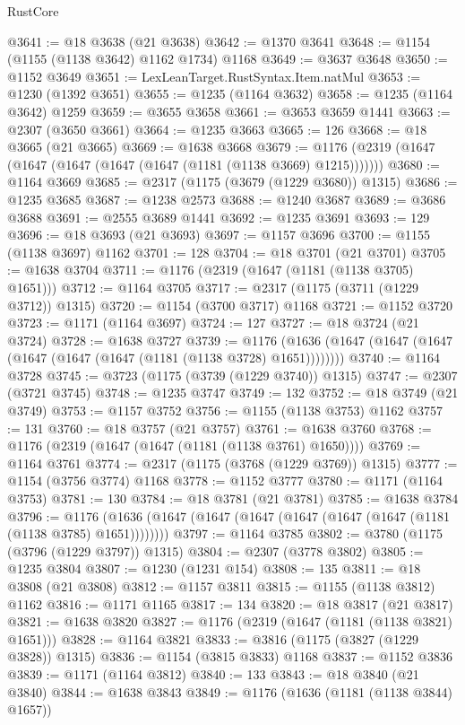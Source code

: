 \begin{lexlean}{RustCore}
\begin{coremodule}
@3641 := @18 @3638 (@21 @3638)
@3642 := @1370 @3641
@3648 := @1154 (@1155 (@1138 @3642) @1162 @1734) @1168
@3649 := @3637 @3648
@3650 := @1152 @3649
@3651 := LexLeanTarget.RustSyntax.Item.natMul
@3653 := @1230 (@1392 @3651)
@3655 := @1235 (@1164 @3632)
@3658 := @1235 (@1164 @3642) @1259
@3659 := @3655 @3658
@3661 := @3653 @3659 @1441
@3663 := @2307 (@3650 @3661)
@3664 := @1235 @3663
@3665 := 126
@3668 := @18 @3665 (@21 @3665)
@3669 := @1638 @3668
@3679 := @1176 (@2319 (@1647 (@1647 (@1647 (@1647 (@1647 (@1181 (@1138 @3669) @1215)))))))
@3680 := @1164 @3669
@3685 := @2317 (@1175 (@3679 (@1229 @3680)) @1315)
@3686 := @1235 @3685
@3687 := @1238 @2573
@3688 := @1240 @3687
@3689 := @3686 @3688
@3691 := @2555 @3689 @1441
@3692 := @1235 @3691
@3693 := 129
@3696 := @18 @3693 (@21 @3693)
@3697 := @1157 @3696
@3700 := @1155 (@1138 @3697) @1162
@3701 := 128
@3704 := @18 @3701 (@21 @3701)
@3705 := @1638 @3704
@3711 := @1176 (@2319 (@1647 (@1181 (@1138 @3705) @1651)))
@3712 := @1164 @3705
@3717 := @2317 (@1175 (@3711 (@1229 @3712)) @1315)
@3720 := @1154 (@3700 @3717) @1168
@3721 := @1152 @3720
@3723 := @1171 (@1164 @3697)
@3724 := 127
@3727 := @18 @3724 (@21 @3724)
@3728 := @1638 @3727
@3739 := @1176 (@1636 (@1647 (@1647 (@1647 (@1647 (@1647 (@1647 (@1181 (@1138 @3728) @1651))))))))
@3740 := @1164 @3728
@3745 := @3723 (@1175 (@3739 (@1229 @3740)) @1315)
@3747 := @2307 (@3721 @3745)
@3748 := @1235 @3747
@3749 := 132
@3752 := @18 @3749 (@21 @3749)
@3753 := @1157 @3752
@3756 := @1155 (@1138 @3753) @1162
@3757 := 131
@3760 := @18 @3757 (@21 @3757)
@3761 := @1638 @3760
@3768 := @1176 (@2319 (@1647 (@1647 (@1181 (@1138 @3761) @1650))))
@3769 := @1164 @3761
@3774 := @2317 (@1175 (@3768 (@1229 @3769)) @1315)
@3777 := @1154 (@3756 @3774) @1168
@3778 := @1152 @3777
@3780 := @1171 (@1164 @3753)
@3781 := 130
@3784 := @18 @3781 (@21 @3781)
@3785 := @1638 @3784
@3796 := @1176 (@1636 (@1647 (@1647 (@1647 (@1647 (@1647 (@1647 (@1181 (@1138 @3785) @1651))))))))
@3797 := @1164 @3785
@3802 := @3780 (@1175 (@3796 (@1229 @3797)) @1315)
@3804 := @2307 (@3778 @3802)
@3805 := @1235 @3804
@3807 := @1230 (@1231 @154)
@3808 := 135
@3811 := @18 @3808 (@21 @3808)
@3812 := @1157 @3811
@3815 := @1155 (@1138 @3812) @1162
@3816 := @1171 @1165
@3817 := 134
@3820 := @18 @3817 (@21 @3817)
@3821 := @1638 @3820
@3827 := @1176 (@2319 (@1647 (@1181 (@1138 @3821) @1651)))
@3828 := @1164 @3821
@3833 := @3816 (@1175 (@3827 (@1229 @3828)) @1315)
@3836 := @1154 (@3815 @3833) @1168
@3837 := @1152 @3836
@3839 := @1171 (@1164 @3812)
@3840 := 133
@3843 := @18 @3840 (@21 @3840)
@3844 := @1638 @3843
@3849 := @1176 (@1636 (@1181 (@1138 @3844) @1657))

\end{coremodule}
\end{lexlean}

